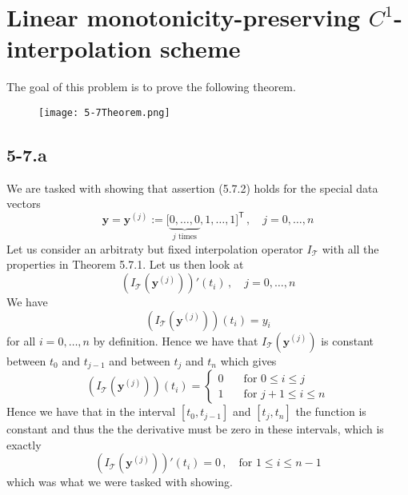 \documentclass{article}
\begin{document}
\section*{Linear monotonicity-preserving $C^{1}$-interpolation scheme}
The goal of this problem is to prove the following theorem.

\begin{figure}[!hbt]
    \centering
\texttt{[image: 5-7Theorem.png]}
\end{figure}

\subsection*{5-7.a}
We are tasked with showing that assertion (5.7.2) holds for the special data vectors
\begin{equation*}
    \mathbf{y} = \mathbf{y}^{\left(j\right)} := \big[\underbrace{0, \dots, 0}_{\text{$j$ times}}, 1, \dots, 1\big]^{\mathsf{T}}\, , \quad j = 0, \dots, n
\end{equation*}
Let us consider an arbitraty but fixed interpolation operator $I_{\mathcal{T}}$ with all the properties in Theorem 5.7.1. Let us then look at 
\begin{equation*}
    \left(I_{\mathcal{T}}\left(\mathbf{y}^{\left(j\right)}\right)\right)'\left(t_{i}\right)\,,\quad j = 0, \dots, n
\end{equation*}
We have 
\begin{equation*}
    \left(I_{\mathcal{T}}\left(\mathbf{y}^{\left(j\right)}\right)\right)\left(t_{i}\right) = y_{i}
\end{equation*}
for all $i= 0, \dots, n$ by definition. Hence we have that $I_{\mathcal{T}}\left(\mathbf{y}^{\left(j\right)}\right)$ is constant between $t_{0}$ and $t_{j-1}$ and between $t_{j}$ and $t_{n}$ which gives
\begin{equation*}
    \left(I_{\mathcal{T}}\left(\mathbf{y}^{\left(j\right)}\right)\right)\left(t_{i}\right) = \begin{cases}
    0 \quad &\text{for } 0 \leq i \leq j \\
    1 &\text{for } j + 1 \leq i \leq n 
    \end{cases}
\end{equation*}
Hence we have that in the interval $\left[t_{0}, t_{j-1}\right]$ and $\left[t_{j}, t_{n}\right]$ the function is constant and thus the the derivative must be zero in these intervals, which is exactly 
\begin{equation*}
    \left(I_{\mathcal{T}}\left(\mathbf{y}^{\left(j\right)}\right)\right)'\left(t_{i}\right) = 0 \,,\quad \text{for } 1 \leq i \leq n-1
\end{equation*}
which was what we were tasked with showing.
\end{document}
